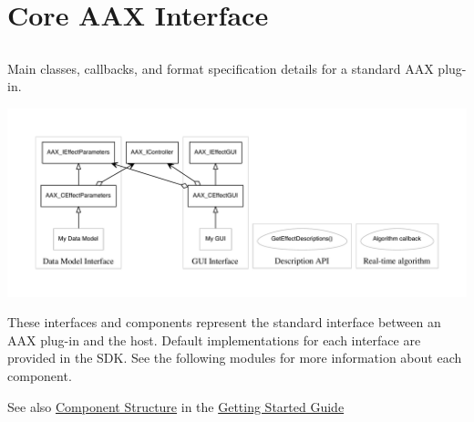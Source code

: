 \hypertarget{a00325}{}\section{Core A\+A\+X Interface}
\label{a00325}


\subsection{ }
Main classes, callbacks, and format specification details for a standard A\+A\+X plug-\/in. 


\begin{DoxyImage}
\includegraphics[width=\textwidth,height=\textheight/2,keepaspectratio=true]{dot_maininterface}
\caption{Main classes and callbacks for a standard A\+A\+X plug-\/in}
\end{DoxyImage}
 These interfaces and components represent the standard interface between an A\+A\+X plug-\/in and the host. Default implementations for each interface are provided in the S\+D\+K. See the following modules for more information about each component.

\begin{DoxySeeAlso}{See also}
\hyperlink{a00324_subsection__component_structure}{Component Structure} in the \hyperlink{a00324}{Getting Started Guide} 
\end{DoxySeeAlso}
